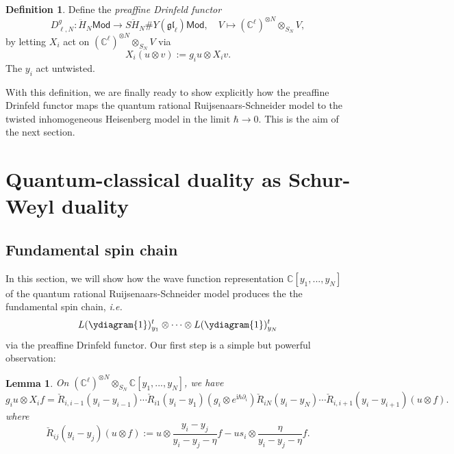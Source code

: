 \documentclass[11pt]{report}
\newtheorem{lemma}[theorem]{Lemma}
\theoremstyle{definition}
\newtheorem{definition}[theorem]{Definition}
\theoremstyle{remark}
\theoremstyle{remark}
\newcommand{\C}{\mathbb{C}}
\newcommand{\I}{\mathrm{i}}
\begin{document}
\begin{definition}
Define the \emph{preaffine Drinfeld functor}
\begin{equation*}
D_{\ell,N}^g: \ddot H_N\mathsf{Mod} \to S\ddot H_N \# Y(\mathfrak{gl}_\ell)\mathsf{Mod}, \quad V \mapsto (\C^\ell)^{\otimes N} \otimes_{S_N} V,
\end{equation*}
by letting $X_i$ act on $(\C^\ell)^{\otimes N} \otimes_{S_N} V$ via
\begin{equation*}
X_i(u \otimes v) := g_i u \otimes X_i v.
\end{equation*}
The $y_i$ act untwisted.
\end{definition}

With this definition, we are finally ready to show explicitly how the preaffine Drinfeld functor maps the quantum rational Ruijsenaars-Schneider model to the twisted inhomogeneous Heisenberg model in the limit $\hbar \to 0$. This is the aim of the next section.

\section{Quantum-classical duality as Schur-Weyl duality}

\subsection{Fundamental spin chain}

In this section, we will show how the wave function representation $\C[y_1,...,y_N]$ of the quantum rational Ruijsenaars-Schneider model produces the the fundamental spin chain, \emph{i.e.}
\begin{equation*}
L(\ydiagram{1})_{y_1}^t \otimes \cdots \otimes L(\ydiagram{1})_{y_N}^t
\end{equation*}
via the preaffine Drinfeld functor. Our first step is a simple but powerful observation:

\begin{lemma}
On $(\C^\ell)^{\otimes N} \otimes_{S_N} \C[y_1,...,y_N]$, we have
\begin{equation*}
g_i u \otimes X_i f = \check R_{i,i-1}(y_i-y_{i-1}) \cdots \check R_{i1}(y_i-y_1) (g_i \otimes e^{\I \hbar \partial_i}) \check R_{iN}(y_i-y_N) \cdots \check R_{i,i+1}(y_i-y_{i+1}) (u \otimes f).
\end{equation*}
where
\begin{equation*}
\check R_{ij}(y_i-y_j) (u \otimes f) := u \otimes \frac{y_i-y_j}{y_i-y_j-\eta} f - u s_i \otimes \frac{\eta}{y_i-y_j-\eta} f.
\end{equation*}
\end{lemma}
\end{document}
